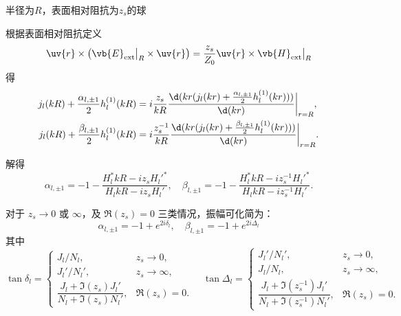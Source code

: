 \begin{example}
	半径为\(R\)，表面相对阻抗为\(z_s\)的球

	根据表面相对阻抗定义 \begin{equation*}
		\uv{r} \times \left( \vb{E}_\text{ext}\big|_{R} \times \uv{r} \right) = \frac{z_s}{Z_0} \uv{r} \times \vb{H}_\text{ext}\big|_{R}
	\end{equation*}
	得
	\begin{align*}
		j_l(kR)+\frac{\alpha_{l,\pm1}}{2}h_l^{(1)}(kR) & = i\frac{z_s}{kR}\frac{\d(kr(j_l(kr)+\frac{\alpha_{l,\pm1}}{2}h_l^{(1)}(kr)))}{\d(kr)}\bigg|_{r=R},     \\
		j_l(kR)+\frac{\beta_{l,\pm1}}{2}h_l^{(1)}(kR)  & = i\frac{z_s^{-1}}{kR}\frac{\d(kr(j_l(kr)+\frac{\beta_{l,\pm1}}{2}h_l^{(1)}(kr)))}{\d(kr)}\bigg|_{r=R}.
	\end{align*}

	解得
	\begin{equation*}
		\alpha_{l,\pm1} = -1-\frac{H_l^*kR-iz_sH_l'^*}{H_lkR-iz_sH_l'}, \quad \beta_{l,\pm1} = -1-\frac{H_l^*kR-iz_s^{-1}H_l'^*}{H_lkR-iz_s^{-1}H_l'}.
	\end{equation*}

	对于 \(z_s\to0\) 或 \(\infty\)，及 \(\Re(z_s)=0\) 三类情况，振幅可化简为：
	\begin{equation*}
		\alpha_{l,\pm1}=-1+e^{2i\delta_{l}},\quad \beta_{l,\pm1}=-1+e^{2i\Delta_{l}}
	\end{equation*}
	其中
	\begin{equation*}
		\tan\delta_{l}=
		\begin{cases}
			J_l/N_l,                                    & z_s\to0,      \\
			J_l'/N_l',                                  & z_s\to\infty, \\
			\dfrac{J_l+\Im(z_s)J_l'}{N_l+\Im(z_s)N_l'}, & \Re(z_s)=0.
		\end{cases}\quad
		\tan\Delta_{l}=
		\begin{cases}
			J_l'/N_l',                                            & z_s\to0,      \\
			J_l/N_l,                                              & z_s\to\infty, \\
			\dfrac{J_l+\Im(z_s^{-1})J_l'}{N_l+\Im(z_s^{-1})N_l'}, & \Re(z_s)=0.
		\end{cases}
	\end{equation*}


\end{example}
